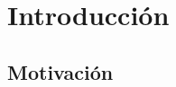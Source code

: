 \chapter{Introducción}
\label{chap:introduccion}



\section{Motivación} 
 \label{sec:intro-motivation}
 
